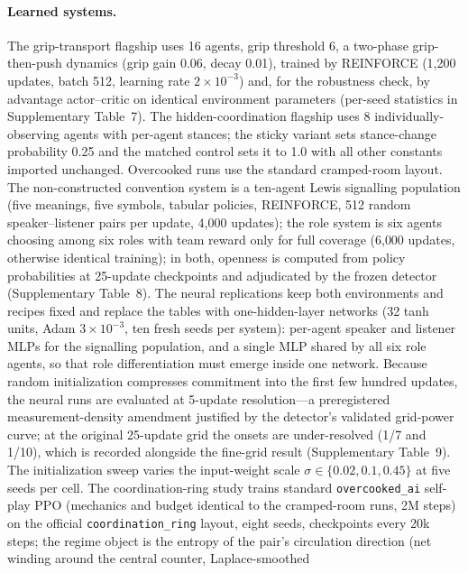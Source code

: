 \documentclass[11pt]{article}
\begin{document}
\paragraph{Learned systems.}
The grip-transport flagship uses 16 agents, grip threshold 6, a two-phase
grip-then-push dynamics (grip gain 0.06, decay 0.01), trained by
REINFORCE\citep{williams1992simple} (1{,}200 updates, batch 512, learning
rate $2\times10^{-3}$) and, for the robustness check, by advantage
actor--critic\citep{mnih2016asynchronous} on identical environment
parameters (per-seed statistics in Supplementary Table~7). The hidden-coordination flagship uses 8 individually-observing
agents with per-agent stances; the sticky variant sets stance-change
probability 0.25 and the matched control sets it to 1.0 with all other
constants imported unchanged. Overcooked runs use the standard
cramped-room layout\citep{carroll2019utility}. The non-constructed
convention system is a ten-agent Lewis signalling
population\citep{lewis1969convention} (five meanings, five symbols,
tabular policies, REINFORCE, 512 random speaker--listener pairs per
update, 4{,}000 updates); the role system is six agents choosing among
six roles with team reward only for full coverage (6{,}000 updates,
otherwise identical training); in both, openness is computed from
policy probabilities at 25-update checkpoints and adjudicated by the
frozen detector (Supplementary Table~8). The neural replications keep both environments and
recipes fixed and replace the tables with one-hidden-layer networks
(32 tanh units, Adam $3\times10^{-3}$, ten fresh seeds per system):
per-agent speaker and listener MLPs for the signalling population, and
a single MLP shared by all six role agents, so that role
differentiation must emerge inside one network. Because random
initialization compresses commitment into the first few hundred
updates, the neural runs are evaluated at 5-update resolution---a
preregistered measurement-density amendment justified by the
detector's validated grid-power curve; at the original 25-update grid
the onsets are under-resolved (1/7 and 1/10), which is recorded
alongside the fine-grid result (Supplementary Table~9). The initialization sweep varies the
input-weight scale $\sigma\in\{0.02,0.1,0.45\}$ at five seeds per
cell. The coordination-ring study trains standard
\texttt{overcooked\_ai} self-play PPO (mechanics and budget identical
to the cramped-room runs, 2M steps) on the official
\texttt{coordination\_ring} layout, eight seeds, checkpoints every 20k
steps; the regime object is the entropy of the pair's circulation
direction (net winding around the central counter, Laplace-smoothed
\end{document}
